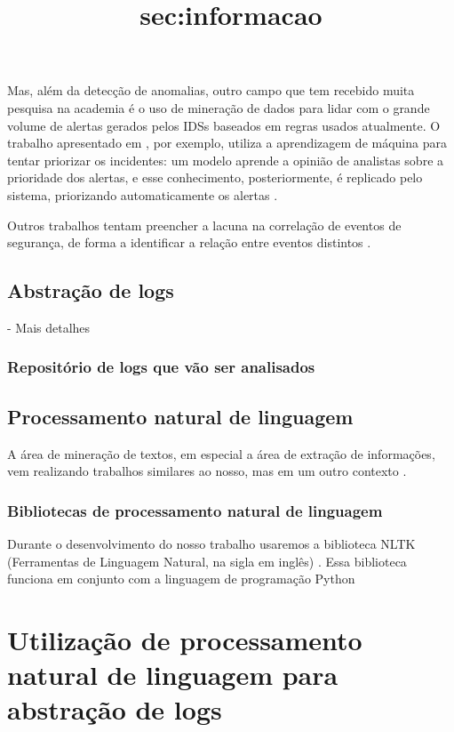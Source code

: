 \documentclass[
	12pt,				%
	openright,			%
	twoside,			%
	a4paper,			%
	english,			%
	french,				%
	spanish,			%
	brazil,				%
	]{abntex2}
\begin{document}
Mas, além da detecção de anomalias, outro campo que tem recebido muita pesquisa na academia é o uso de mineração de dados para lidar com o grande volume de alertas gerados pelos IDSs baseados em regras usados atualmente. O trabalho apresentado em \cite{zomlot2013aiding}, por exemplo, utiliza a aprendizagem de máquina para tentar priorizar os incidentes: um modelo aprende a opinião de analistas sobre a prioridade dos alertas, e esse conhecimento, posteriormente, é replicado pelo sistema, priorizando automaticamente os alertas .

Outros trabalhos tentam preencher a lacuna na correlação de eventos de segurança, de forma a identificar a relação entre eventos distintos \cite{smith2008using, stroeh2013approach}.

\section{Abstração de logs}\title{sec:informacao}
- Mais detalhes

\subsection{Repositório de logs que vão ser analisados}

\section{Processamento natural de linguagem}

A área de mineração de textos, em especial a área de extração de informações, vem realizando trabalhos similares ao nosso, mas em um outro contexto \cite{duque2012processo, matos2010environment}.

\subsection{Bibliotecas de processamento natural de linguagem}

Durante o desenvolvimento do nosso trabalho usaremos a biblioteca NLTK (Ferramentas de Linguagem Natural, na sigla em inglês) \cite{bird2009natural}. Essa biblioteca funciona em conjunto com a linguagem de programação Python


\chapter{Utilização de processamento natural de linguagem para abstração de logs}\label{chap:proposta}
\end{document}
